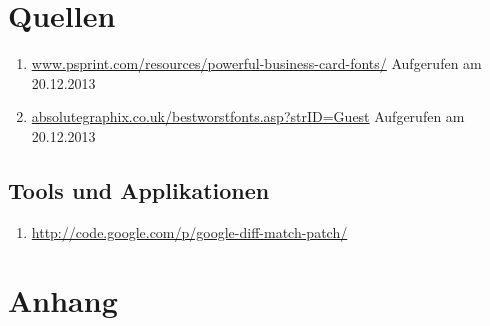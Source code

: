 \documentclass[10pt]{article}
\begin{document}
	

\section{Quellen}

\begin{enumerate}
\item \url{www.psprint.com/resources/powerful-business-card-fonts/} Aufgerufen am 20.12.2013
\item \url{absolutegraphix.co.uk/bestworstfonts.asp?strID=Guest} Aufgerufen am 20.12.2013
\end{enumerate}

\subsection{Tools und Applikationen}
\begin{enumerate}
\item \url{http://code.google.com/p/google-diff-match-patch/}
\end{enumerate}

\section{Anhang}


\end{document}
